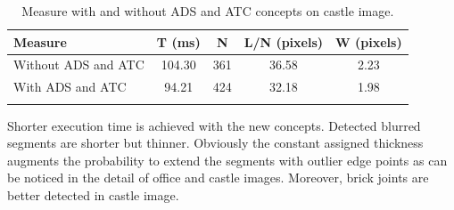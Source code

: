 \documentclass[11pt]{article}
\begin{document}
\begin{longtable}[]{@{}lcccc@{}}
\toprule
Measure & T (ms) & N & L/N (pixels) & W (pixels)\tabularnewline
\midrule
Without ADS and ATC & 104.30 & 361 & 36.58 & 2.23\tabularnewline
With ADS and ATC & 94.21 & 424 & 32.18 & 1.98\tabularnewline
\bottomrule

\caption{Measure with and without ADS and ATC concepts on castle
image.}

\end{longtable}

Shorter execution time is achieved with the new concepts. Detected blurred segments are shorter but thinner. Obviously the constant assigned thickness augments the probability to extend the segments with outlier edge points as can be noticed in the detail of office and castle images. Moreover, brick joints are better detected in castle image.



\end{document}
